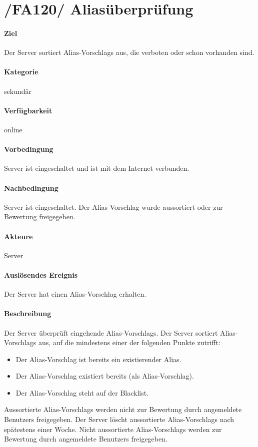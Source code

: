 \section{/FA120/ Aliasüberprüfung}
\label{/FA120/}
\paragraph{Ziel}
Der \Gls{Server} sortiert \Glspl{Alias-Vorschlag} aus, die verboten oder schon vorhanden sind.
\paragraph{Kategorie}
sekundär
\paragraph{Verfügbarkeit}
online
\paragraph{Vorbedingung}
\Gls{Server} ist eingeschaltet und ist mit dem Internet verbunden.
\paragraph{Nachbedingung}
\Gls{Server} ist eingeschaltet. Der \Gls{Alias-Vorschlag} wurde aussortiert oder zur Bewertung freigegeben.
\paragraph{Akteure}
\Gls{Server}
\paragraph{Auslösendes Ereignis}
Der \Gls{Server} hat einen \Gls{Alias-Vorschlag} erhalten.
\paragraph{Beschreibung}
Der \Gls{Server} überprüft eingehende \Glspl{Alias-Vorschlag}. Der \Gls{Server} sortiert \Glspl{Alias-Vorschlag} aus, auf die mindestens einer der folgenden Punkte zutrifft:
\begin{itemize}
    \item Der \Gls{Alias-Vorschlag} ist bereits ein existierender \Gls{Alias}.
    \item Der \Gls{Alias-Vorschlag} existiert bereits (als \Gls{Alias-Vorschlag}).
    \item Der \Gls{Alias-Vorschlag} steht auf der \Gls{Blacklist}.
\end{itemize}
Aussortierte \Glspl{Alias-Vorschlag} werden nicht zur Bewertung durch angemeldete \Glspl{Benutzer} freigegeben. Der \Gls{Server} löscht aussortierte \Glspl{Alias-Vorschlag} nach spätestens einer Woche. Nicht aussortierte \Glspl{Alias-Vorschlag} werden zur Bewertung durch angemeldete \Glspl{Benutzer} freigegeben.
